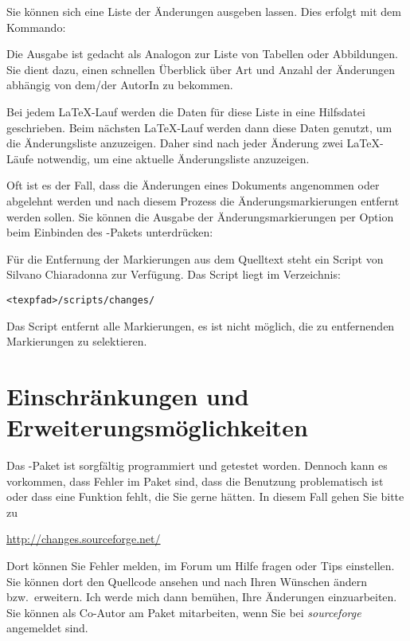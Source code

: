 
Sie können sich eine Liste der Änderungen ausgeben lassen.
Dies erfolgt mit dem Kommando:


Die Ausgabe ist gedacht als Analogon zur Liste von Tabellen oder Abbildungen.
Sie dient dazu, einen schnellen Überblick über Art und Anzahl der Änderungen abhängig von dem/der AutorIn zu bekommen.

Bei jedem \LaTeX-Lauf werden die Daten für diese Liste in eine Hilfsdatei geschrieben.
Beim nächsten \LaTeX-Lauf werden dann diese Daten genutzt, um die Änderungsliste anzuzeigen.
Daher sind nach jeder Änderung zwei \LaTeX-Läufe notwendig, um eine aktuelle Änderungsliste anzuzeigen.


Oft ist es der Fall, dass die Änderungen eines Dokuments angenommen oder abgelehnt werden und nach diesem Prozess die Änderungsmarkierungen entfernt werden sollen.
Sie können die Ausgabe der Änderungsmarkierungen per Option beim Einbinden des -Pakets unterdrücken:


Für die Entfernung der Markierungen aus dem Quelltext steht ein Script von Silvano Chiaradonna zur Verfügung.
Das Script liegt im Verzeichnis:

\texttt{<texpfad>/scripts/changes/}

Das Script entfernt alle Markierungen, es ist nicht möglich, die zu entfernenden Markierungen zu selektieren.

\section{Einschränkungen und Erweiterungsmöglichkeiten}
\label{sec:limitations}

Das -Paket ist sorgfältig programmiert und getestet worden.
Dennoch kann es vorkommen, dass Fehler im Paket sind, dass die Benutzung problematisch ist oder dass eine Funktion fehlt, die Sie gerne hätten.
In diesem Fall gehen Sie bitte zu

\url{http://changes.sourceforge.net/}

Dort können Sie Fehler melden, im Forum um Hilfe fragen oder Tips einstellen.
Sie können dort den Quellcode ansehen und nach Ihren Wünschen ändern bzw.\ erweitern.
Ich werde mich dann bemühen, Ihre Änderungen einzuarbeiten.
Sie können als Co-Autor am Paket mitarbeiten, wenn Sie bei \emph{sourceforge} angemeldet sind.

